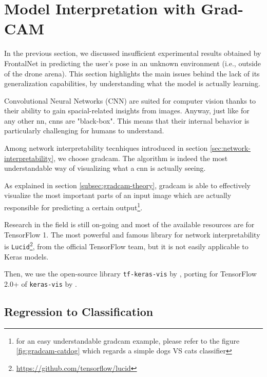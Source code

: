 \section{Model Interpretation with Grad-CAM}
\label{sec:model-interpretration}


In the previous section, we discussed insufficient experimental results obtained by FrontalNet in predicting the user's pose in an unknown environment (i.e., outside of the drone arena). This section highlights the main issues behind the lack of its generalization capabilities, by understanding what the model is actually learning.

\medskip

Convolutional Neural Networks (CNN) are suited for computer vision thanks to their ability to gain spacial-related insights from images. Anyway, just like for any other \gls{nn}, \gls{cnn}s are "black-box". This means that their internal behavior is particularly challenging for humans to understand.

Among network interpretability tecnhiques introduced in section \ref{sec:network-interpretability}, we choose \gls{gradcam}. The algorithm is indeed the most understandable way of visualizing what a \gls{cnn} is actually seeing.

As explained in section \ref{subsec:gradcam-theory}, \gls{gradcam} is able to effectively visualize the most important parts of an input image which are actually responsible for predicting a certain output\footnote{for an easy understandable \gls{gradcam} example, please refer to the figure \ref{fig:gradcam-catdog} which regards a simple dogs VS cats classifier}.

\medskip

Research in the field is still on-going and most of the available resources are for TensorFlow 1. The most powerful and famous library for network interpretability is \texttt{Lucid}\footnote{\url{https://github.com/tensorflow/lucid}}, from the official TensorFlow team, but it is not easily applicable to Keras models.

Then, we use the open-source library \texttt{tf-keras-vis} by \cite{tf-keras-vis}, porting for TensorFlow 2.0+ of \texttt{keras-vis} by \cite{keras-vis}.



\subsection{Regression to Classification}
\label{subsec:gradcam-regrtoclass}

